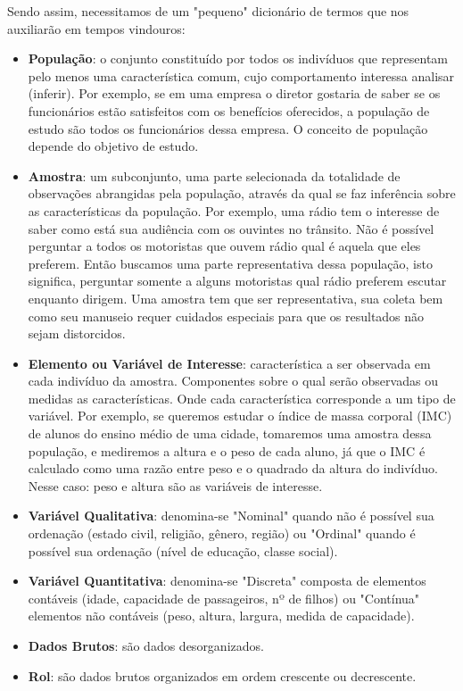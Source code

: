 Sendo assim, necessitamos de um "pequeno" dicionário de termos que nos auxiliarão em tempos vindouros:
\begin{itemize}
	\item \textbf{População}: o conjunto constituído por todos os indivíduos que representam pelo menos uma característica comum, cujo comportamento interessa analisar (inferir). Por exemplo, se em uma empresa o diretor gostaria de saber se os funcionários estão satisfeitos com os benefícios oferecidos, a população de estudo são todos os funcionários dessa empresa. O conceito de população depende do objetivo de estudo.
	\item \textbf{Amostra}: um subconjunto, uma parte selecionada da totalidade de observações abrangidas pela população, através da qual se faz inferência sobre as características da população. Por exemplo, uma rádio tem o interesse de saber como está sua audiência com os ouvintes no trânsito. Não é possível perguntar a todos os motoristas que ouvem rádio qual é aquela que eles preferem. Então buscamos uma parte representativa dessa população, isto significa, perguntar somente a alguns motoristas qual rádio preferem escutar enquanto dirigem. Uma amostra tem que ser representativa, sua coleta bem como seu manuseio requer cuidados especiais para que os resultados não sejam distorcidos. 
	\item \textbf{Elemento ou Variável de Interesse}: característica a ser observada em cada indivíduo da amostra. Componentes sobre o qual serão observadas ou medidas as características. Onde cada característica corresponde a um tipo de variável. Por exemplo, se queremos estudar o índice de massa corporal (IMC) de alunos do ensino médio de uma cidade, tomaremos uma amostra dessa população, e mediremos a altura e o peso de cada aluno, já que o IMC é calculado como uma razão entre peso e o quadrado da altura do indivíduo. Nesse caso: peso e altura são as variáveis de interesse.
	\item \textbf{Variável Qualitativa}: denomina-se "Nominal" quando não é possível sua ordenação (estado civil, religião, gênero, região) ou "Ordinal" quando é possível sua ordenação (nível de educação, classe social).
	\item \textbf{Variável Quantitativa}: denomina-se "Discreta" composta de elementos contáveis (idade, capacidade de passageiros, nº de filhos) ou "Contínua" elementos não contáveis (peso, altura, largura, medida de capacidade).
	\item \textbf{Dados Brutos}: são dados desorganizados.
	\item \textbf{Rol}: são dados brutos organizados em ordem crescente ou decrescente. 
\end{itemize}

